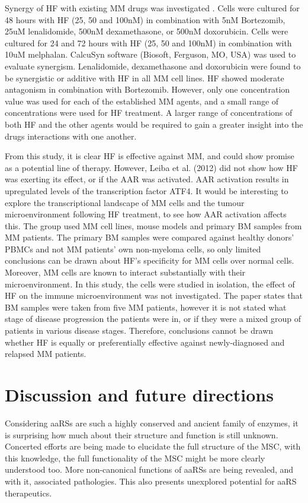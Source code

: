 Synergy of HF with existing MM drugs was investigated \cite{leiba2012halofuginone}.
Cells were cultured for 48 hours with HF (25, 50 and 100nM) in combination with 5nM Bortezomib, 25uM lenalidomide, 500nM dexamethasone, or 500nM doxorubicin. Cells were cultured for 24 and 72 hours with HF (25, 50 and 100nM) in combination with 10uM melphalan.
CalcuSyn software (Biosoft, Ferguson, MO, USA) was used to evaluate synergism.
Lenalidomide, dexamethasone and doxorubicin were found to be synergistic or additive with HF in all MM cell lines.
HF showed moderate antagonism in combination with Bortezomib.
However, only one concentration value was used for each of the established MM agents, and a small range of concentrations were used for HF treatment.
A larger range of concentrations of both HF and the other agents would be required to gain a greater insight into the drugs interactions with one another.

From this study, it is clear HF is effective against MM, and could show promise as a potential line of therapy.
However, Leiba et al. (2012) did not show how HF was exerting its effect, or if the AAR was activated.
AAR activation results in upregulated levels of the transcription factor ATF4.
It would be interesting to explore the transcriptional landscape of MM cells and the tumour microenvironment following HF treatment, to see how AAR activation affects this.
The group used MM cell lines, mouse models and primary BM samples from MM patients.
The primary BM samples were compared against healthy donors' PBMCs and not MM patients' own non-myeloma cells, so only limited conclusions can be drawn about HF's specificity for MM cells over normal cells.
Moreover, MM cells are known to interact substantially with their microenvironment.
In this study, the cells were studied in isolation, the effect of HF on the immune microenvironment was not investigated.
The paper states that BM samples were taken from five MM patients, however it is not stated what stage of disease progression the patients were in, or if they were a mixed group of patients in various disease stages.
Therefore, conclusions cannot be drawn whether HF is equally or preferentially effective against newly-diagnosed and relapsed MM patients.

\section{Discussion and future directions}

Considering aaRSs are such a highly conserved and ancient family of enzymes, it is surprising how much about their structure and function is still unknown.
Concerted efforts are being made to elucidate the full structure of the MSC, with this knowledge, the full functionality of the MSC might be more clearly understood too.
More non-canonical functions of aaRSs are being revealed, and with it, associated pathologies.
This also presents unexplored potential for aaRS therapeutics.

